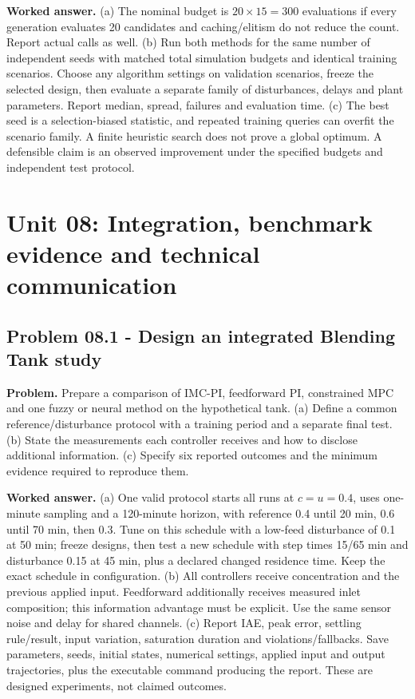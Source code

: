 \documentclass[11pt,a4paper]{article}
\begin{document}
\textbf{Worked answer.} (a) The nominal budget is $20\times15=300$ evaluations if every generation evaluates 20 candidates and caching/elitism do not reduce the count. Report actual calls as well. (b) Run both methods for the same number of independent seeds with matched total simulation budgets and identical training scenarios. Choose any algorithm settings on validation scenarios, freeze the selected design, then evaluate a separate family of disturbances, delays and plant parameters. Report median, spread, failures and evaluation time. (c) The best seed is a selection-biased statistic, and repeated training queries can overfit the scenario family. A finite heuristic search does not prove a global optimum. A defensible claim is an observed improvement under the specified budgets and independent test protocol.


\clearpage\section{Unit 08: Integration, benchmark evidence and technical communication}
\subsection{Problem 08.1 - Design an integrated Blending Tank study}
\textbf{Problem.} Prepare a comparison of IMC-PI, feedforward PI, constrained MPC and one fuzzy or neural method on the hypothetical tank. (a) Define a common reference/disturbance protocol with a training period and a separate final test. (b) State the measurements each controller receives and how to disclose additional information. (c) Specify six reported outcomes and the minimum evidence required to reproduce them.


\textbf{Worked answer.} (a) One valid protocol starts all runs at $c=u=0.4$, uses one-minute sampling and a 120-minute horizon, with reference 0.4 until 20 min, 0.6 until 70 min, then 0.3. Tune on this schedule with a low-feed disturbance of 0.1 at 50 min; freeze designs, then test a new schedule with step times 15/65 min and disturbance 0.15 at 45 min, plus a declared changed residence time. Keep the exact schedule in configuration. (b) All controllers receive concentration and the previous applied input. Feedforward additionally receives measured inlet composition; this information advantage must be explicit. Use the same sensor noise and delay for shared channels. (c) Report IAE, peak error, settling rule/result, input variation, saturation duration and violations/fallbacks. Save parameters, seeds, initial states, numerical settings, applied input and output trajectories, plus the executable command producing the report. These are designed experiments, not claimed outcomes.
\end{document}
